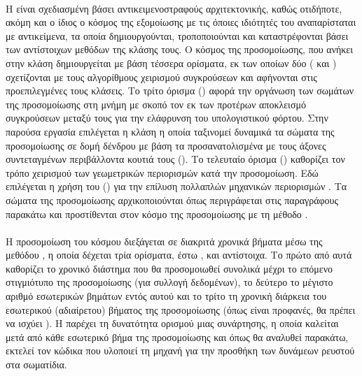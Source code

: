\paragraph{} Η  είναι σχεδιασμένη βάσει αντικειμενοστραφούς αρχιτεκτονικής,
καθώς οτιδήποτε, ακόμη και ο ίδιος ο κόσμος της εξομοίωσης με τις όποιες ιδιότητές του
αναπαρίσταται με αντικείμενα, τα οποία δημιουργούνται, τροποποιούνται και καταστρέφονται
βάσει των αντίστοιχων μεθόδων της κλάσης τους. Ο κόσμος της προσομοίωσης, που ανήκει στην
κλάση  δημιουργείται με βάση τέσσερα ορίσματα, εκ των οποίων
δύο ( και ) σχετίζονται με τους
αλγορίθμους χειρισμού συγκρούσεων και αφήνονται στις προεπιλεγμένες τους κλάσεις. Το τρίτο
όρισμα () αφορά την οργάνωση των σωμάτων της προσομοίωσης στη
μνήμη με σκοπό τον εκ των προτέρων αποκλεισμό συγκρούσεων μεταξύ τους για την ελάφρυνση
του υπολογιστικού φόρτου. Στην παρούσα εργασία επιλέγεται η κλάση  η
οποία ταξινομεί δυναμικά τα σώματα της προσομοίωσης σε δομή δένδρου με βάση τα
προσανατολισμένα με τους άξονες συντεταγμένων περιβάλλοντα κουτιά τους (). Το
τελευταίο όρισμα () καθορίζει τον τρόπο χειρισμού των γεωμετρικών
περιορισμών κατά την προσομοίωση. Εδώ επιλέγεται η χρήση του  () για την επίλυση πολλαπλών μηχανικών περιορισμών
\cite{catto2005iterative}. Τα σώματα της προσομοίωσης αρχικοποιούνται όπως περιγράφεται
στις παραγράφους παρακάτω και προστίθενται στον κόσμο της προσομοίωσης με τη μέθοδο
.

\paragraph{} Η προσομοίωση του κόσμου διεξάγεται σε διακριτά χρονικά βήματα μέσω της
μεθόδου , η οποία δέχεται τρία ορίσματα, έστω ,  και
 αντίστοιχα. Το πρώτο από αυτά καθορίζει το χρονικό διάστημα που θα προσομοιωθεί
συνολικά μέχρι το επόμενο στιγμιότυπο της προσομοίωσης (για συλλογή δεδομένων), το δεύτερο
το μέγιστο αριθμό εσωτερικών βημάτων εντός αυτού και το τρίτο τη χρονική διάρκεια του
εσωτερικού (αδιαίρετου) βήματος της προσομοίωσης (όπως είναι προφανές, θα πρέπει να ισχύει
). Η  παρέχει τη δυνατότητα ορισμού μιας 
συνάρτησης, η οποία καλείται μετά από κάθε εσωτερικό βήμα της προσομοίωσης και όπως θα
αναλυθεί παρακάτω, εκτελεί τον κώδικα που υλοποιεί τη μηχανή  για την προσθήκη
των δυνάμεων ρευστού στα σωματίδια.

